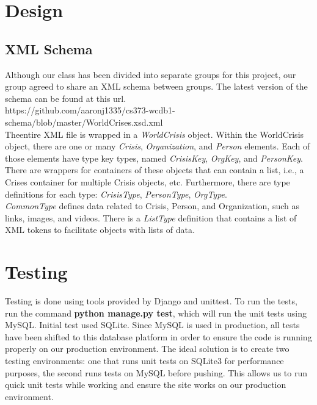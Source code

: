 \documentclass[12pt]{report}
\begin{document}
\newpage
\section*{Design}
\subsection*{XML Schema}
\hfill


Although our class has been divided into separate groups for this project, our group agreed to share an XML schema between groups.
The latest version of the schema can be found at this url.\\

\noindent \small
https://github.com/aaronj1335/cs373-wcdb1-schema/blob/master/WorldCrises.xsd.xml\\


Theentire XML file is wrapped in a \emph{WorldCrisis} object.
Within the WorldCrisis object, there are one or many \emph{Crisis}, \emph{Organization}, and \emph{Person} elements.
Each of those elements have type key types, named \emph{CrisisKey}, \emph{OrgKey}, and \emph{PersonKey}.
There are wrappers for containers of these objects that can contain a list,
i.e., a Crises container for multiple Crisis objects, etc.
Furthermore, there are type definitions for each type: \emph{CrisisType}, \emph{PersonType}, \emph{OrgType}.\\


\emph{CommonType} defines data related to Crisis, Person, and Organization,
such as links, images, and videos.
There is a \emph{ListType} definition that contains a list of XML tokens to facilitate objects with lists of data.

\newpage
\section*{Testing}
\hfill


Testing is done using tools provided by Django and unittest.
To run the tests, run the command \textbf{python manage.py test}, which will run the unit tests using MySQL.
Initial test used SQLite. Since MySQL is used in production, all tests have been shifted to this database platform in order to ensure the code 
is running properly on our production environment.
The ideal solution is to create two testing environments: one that runs unit tests on SQLite3 for performance purposes,
the second runs tests on MySQL before pushing.
This allows us to run quick unit tests while working and ensure the site works on our production environment.
\end{document}

